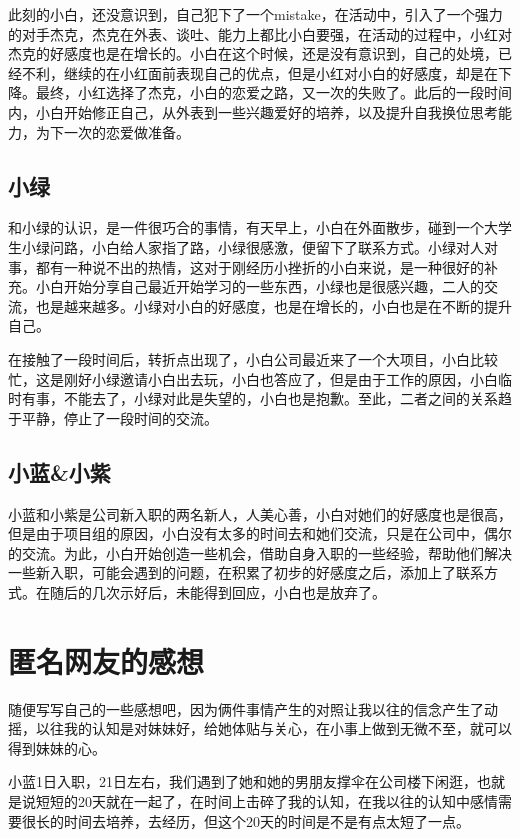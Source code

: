 \documentclass{article}
\begin{document}
此刻的小白，还没意识到，自己犯下了一个mistake，在活动中，引入了一个强力的对手杰克，杰克在外表、谈吐、能力上都比小白要强，在活动的过程中，小红对杰克的好感度也是在增长的。小白在这个时候，还是没有意识到，自己的处境，已经不利，继续的在小红面前表现自己的优点，但是小红对小白的好感度，却是在下降。最终，小红选择了杰克，小白的恋爱之路，又一次的失败了。此后的一段时间内，小白开始修正自己，从外表到一些兴趣爱好的培养，以及提升自我换位思考能力，为下一次的恋爱做准备。

\subsection{小绿}

和小绿的认识，是一件很巧合的事情，有天早上，小白在外面散步，碰到一个大学生小绿问路，小白给人家指了路，小绿很感激，便留下了联系方式。小绿对人对事，都有一种说不出的热情，这对于刚经历小挫折的小白来说，是一种很好的补充。小白开始分享自己最近开始学习的一些东西，小绿也是很感兴趣，二人的交流，也是越来越多。小绿对小白的好感度，也是在增长的，小白也是在不断的提升自己。

在接触了一段时间后，转折点出现了，小白公司最近来了一个大项目，小白比较忙，这是刚好小绿邀请小白出去玩，小白也答应了，但是由于工作的原因，小白临时有事，不能去了，小绿对此是失望的，小白也是抱歉。至此，二者之间的关系趋于平静，停止了一段时间的交流。

\subsection{小蓝\&小紫}

小蓝和小紫是公司新入职的两名新人，人美心善，小白对她们的好感度也是很高，但是由于项目组的原因，小白没有太多的时间去和她们交流，只是在公司中，偶尔的交流。为此，小白开始创造一些机会，借助自身入职的一些经验，帮助他们解决一些新入职，可能会遇到的问题，在积累了初步的好感度之后，添加上了联系方式。在随后的几次示好后，未能得到回应，小白也是放弃了。

\section{匿名网友的感想}

随便写写自己的一些感想吧，因为俩件事情产生的对照让我以往的信念产生了动摇，以往我的认知是对妹妹好，给她体贴与关心，在小事上做到无微不至，就可以得到妹妹的心。

小蓝1日入职，21日左右，我们遇到了她和她的男朋友撑伞在公司楼下闲逛，也就是说短短的20天就在一起了，在时间上击碎了我的认知，在我以往的认知中感情需要很长的时间去培养，去经历，但这个20天的时间是不是有点太短了一点。
\end{document}
